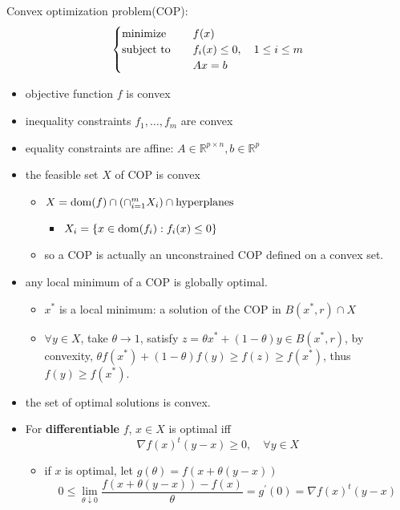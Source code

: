 \begin{remark}
    Convex optimization problem(COP):
    \[\begin{cases}
        \operatorname{minimize} \quad &f(x)\\
        \operatorname{subject\ to} \quad &f_i(x) \le 0, \quad 1 \le i \le m\\
        &Ax = b
    \end{cases}\]
    \begin{itemize}
        \item objective function $f$ is convex
        \item inequality constraints $f_1, \dots, f_m$ are convex
        \item equality constraints are affine: $A \in \mathbb{R}^{p \times n}, b \in \mathbb{R}^p$
        \item the feasible set $X$ of COP is convex \begin{itemize}
            \item $X = \operatorname{dom}(f) \cap (\cap_{i = 1}^m X_i) \cap \text{hyperplanes}$ \begin{itemize}
                \item $X_i = \left\{x \in \operatorname{dom}(f_i): f_i(x) \le 0\right\}$
            \end{itemize}
            \item so a COP is actually an unconstrained COP defined on a convex set. 
        \end{itemize}
        \item any local minimum of a COP is globally optimal.\begin{itemize}
            \item $x^*$ is a local minimum: a solution of the COP in $B(x^*, r) \cap X$
            \item $\forall y \in X$, take $\theta \to 1$, satisfy $z = \theta x^* + (1 - \theta)y \in B(x^*, r)$, by convexity, $\theta f(x^*) + (1 - \theta)f(y) \ge f(z) \ge f(x^*)$, thus $f(y) \ge f(x^*)$.
        \end{itemize}
        \item the set of optimal solutions is convex.
        \item For \textbf{differentiable} $f$, $x \in X$ is optimal iff \[\nabla f(x)^t(y - x) \ge 0, \quad \forall y \in X\]
            \begin{itemize}
                \item if $x$ is optimal, let  $g(\theta) = f(x + \theta(y - x))$ \[0 \leq \lim _{\theta \downarrow 0} \frac{f(x+\theta(y-x))-f(x)}{\theta}=g^{\prime}(0)=\nabla f(x)^{t}(y-x)\]

\end{itemize}
\end{itemize}
\end{remark}

